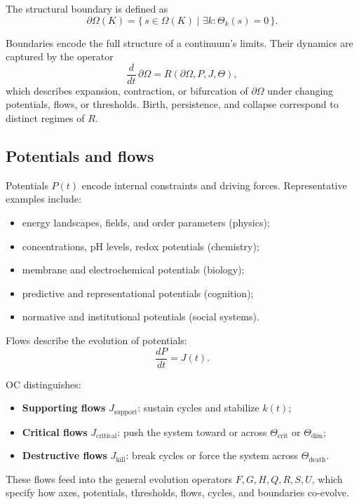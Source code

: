 The structural boundary is defined as
\[
\partial\Omega(K) = \{\, s\in\Omega(K) \mid \exists k: \Theta_k(s)=0 \,\}.
\]

Boundaries encode the full structure of a continuum’s limits.
Their dynamics are captured by the operator
\[
\frac{d}{dt}\,\partial\Omega = R(\partial\Omega, P, J, \Theta),
\]
which describes expansion, contraction, or bifurcation of \(\partial\Omega\) under changing potentials, flows, or thresholds.
Birth, persistence, and collapse correspond to distinct regimes of \(R\).

\subsection{Potentials and flows}

Potentials \(P(t)\) encode internal constraints and driving forces.
Representative examples include:

\begin{itemize}
    \item energy landscapes, fields, and order parameters (physics);
    \item concentrations, pH levels, redox potentials (chemistry);
    \item membrane and electrochemical potentials (biology);
    \item predictive and representational potentials (cognition);
    \item normative and institutional potentials (social systems).
\end{itemize}

Flows describe the evolution of potentials:
\[
\frac{dP}{dt} = J(t).
\]

OC distinguishes:

\begin{itemize}
    \item \textbf{Supporting flows} \(J_{\mathrm{support}}\): sustain cycles and stabilize \(k(t)\);
    \item \textbf{Critical flows} \(J_{\mathrm{critical}}\): push the system toward or across \(\Theta_{\mathrm{crit}}\) or \(\Theta_{\mathrm{dim}}\);
    \item \textbf{Destructive flows} \(J_{\mathrm{kill}}\): break cycles or force the system across \(\Theta_{\mathrm{death}}\).
\end{itemize}

These flows feed into the general evolution operators \(F, G, H, Q, R, S, U\), which specify how axes, potentials, thresholds, flows, cycles, and boundaries co-evolve.

